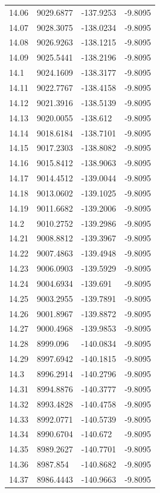 \begin{table}[H]
\begin{tabular}{llll}
14.06 & 9029.6877 & -137.9253 & -9.8095 \\
14.07 & 9028.3075 & -138.0234 & -9.8095 \\
14.08 & 9026.9263 & -138.1215 & -9.8095 \\
14.09 & 9025.5441 & -138.2196 & -9.8095 \\
14.1 & 9024.1609 & -138.3177 & -9.8095 \\
14.11 & 9022.7767 & -138.4158 & -9.8095 \\
14.12 & 9021.3916 & -138.5139 & -9.8095 \\
14.13 & 9020.0055 & -138.612 & -9.8095 \\
14.14 & 9018.6184 & -138.7101 & -9.8095 \\
14.15 & 9017.2303 & -138.8082 & -9.8095 \\
14.16 & 9015.8412 & -138.9063 & -9.8095 \\
14.17 & 9014.4512 & -139.0044 & -9.8095 \\
14.18 & 9013.0602 & -139.1025 & -9.8095 \\
14.19 & 9011.6682 & -139.2006 & -9.8095 \\
14.2 & 9010.2752 & -139.2986 & -9.8095 \\
14.21 & 9008.8812 & -139.3967 & -9.8095 \\
14.22 & 9007.4863 & -139.4948 & -9.8095 \\
14.23 & 9006.0903 & -139.5929 & -9.8095 \\
14.24 & 9004.6934 & -139.691 & -9.8095 \\
14.25 & 9003.2955 & -139.7891 & -9.8095 \\
14.26 & 9001.8967 & -139.8872 & -9.8095 \\
14.27 & 9000.4968 & -139.9853 & -9.8095 \\
14.28 & 8999.096 & -140.0834 & -9.8095 \\
14.29 & 8997.6942 & -140.1815 & -9.8095 \\
14.3 & 8996.2914 & -140.2796 & -9.8095 \\
14.31 & 8994.8876 & -140.3777 & -9.8095 \\
14.32 & 8993.4828 & -140.4758 & -9.8095 \\
14.33 & 8992.0771 & -140.5739 & -9.8095 \\
14.34 & 8990.6704 & -140.672 & -9.8095 \\
14.35 & 8989.2627 & -140.7701 & -9.8095 \\
14.36 & 8987.854 & -140.8682 & -9.8095 \\
14.37 & 8986.4443 & -140.9663 & -9.8095 \\

\end{tabular}
\end{table}
